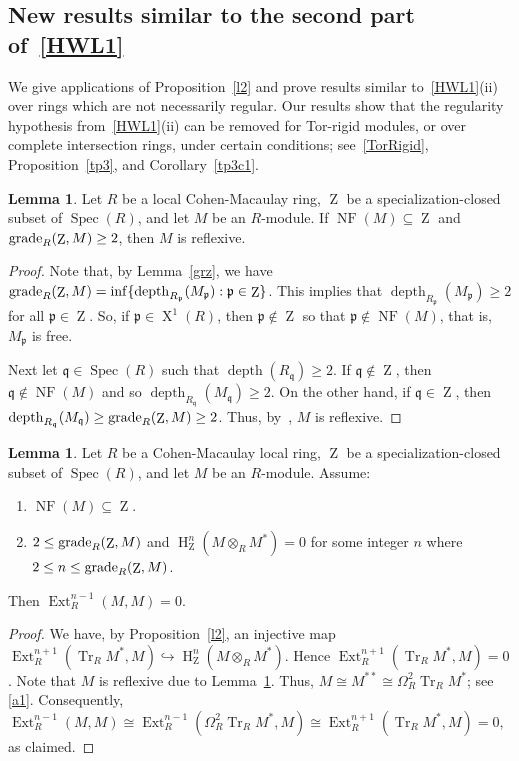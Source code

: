 \documentclass[11pt]{amsart}
\theoremstyle{definition}
\theoremstyle{definition}
\newtheorem{lem}[thm]{Lemma}
\numberwithin{equation}{section}
\newcommand{\fp}{\mathfrak{p}}
\newcommand{\fq}{\mathfrak{q}}
\DeclareMathOperator{\gr}{\textnormal{grade}}
\DeclareMathOperator{\Tr}{Tr}
\DeclareMathOperator{\X}{X}
\DeclareMathOperator{\mz}{Z}
\DeclareMathOperator{\depth}{depth}
\DeclareMathOperator{\Ext}{Ext}
\DeclareMathOperator{\hh}{H}
\DeclareMathOperator{\Spec}{Spec}
\DeclareMathOperator{\NF}{NF}
\begin{document}
\subsection*{New results similar to the second part of~\ref{HWL1}} We give applications of Proposition~\ref{l2} and prove results similar to~\ref{HWL1}(ii) over rings which are not necessarily regular. Our results show that the regularity hypothesis from~\ref{HWL1}(ii) can be removed for Tor-rigid modules, or over complete intersection rings, under certain conditions; see~\ref{TorRigid}, Proposition~\ref{tp3}, and Corollary~\ref{tp3c1}.

\begin{lem} \label{remzi} Let $R$ be a local Cohen-Macaulay ring, $\mz$ be a specialization-closed subset of $\Spec(R)$, and let $M$ be an $R$-module. If $\NF(M)\subseteq\mz$ and $\gr_R(\mz,M)\geq 2$, then $M$ is reflexive. 
\end{lem}

\begin{proof} Note that, by Lemma~\ref{grz}, we have $\gr_R(\mz,M)=\inf\{\depth_{R_\fp}(M_\fp) : \fp\in\mz\}$. This implies that $\depth_{R_\fp}(M_\fp) \geq 2$ for all $\fp \in \mz$. So, if $\fp\in\X^{1}(R)$, then $\fp \notin \mz$ so that $\fp \notin \NF(M)$, that is, $M_\fp$ is free.

Next let $\fq\in \Spec(R)$ such that $\depth(R_\fq)\geq 2$. If $\fq \notin \mz$, then $\fq \notin \NF(M)$ and so $\depth_{R_\fq}(M_\fq)\geq 2$. On the other hand, if $\fq \in \mz$, then 
$\depth_{R_\fq}(M_\fq) \geq \gr_R(\mz,M)\geq 2$. Thus, by~\cite[1.4.1(b)]{BH}, $M$ is reflexive.
\end{proof}

\begin{lem} \label{remzii} Let $R$ be a Cohen-Macaulay local ring, $\mz$ be a specialization-closed subset of $\Spec(R)$, and let $M$ be an $R$-module. Assume:
\begin{enumerate}[\rm(i)]
\item $\NF(M)\subseteq\mz$.
\item $2\leq \gr_R(\mz,M)$ and $\hh^n_{\mz}(M\otimes_RM^*)=0$ for some integer $n$ where $2\leq n\leq\gr_R(\mz,M)$.
\end{enumerate} 
Then $\Ext^{n-1}_R(M,M)=0$. 
\end{lem}

\begin{proof} We have, by Proposition~\ref{l2}, an injective map $\Ext^{n+1}_R(\Tr_R M^{\ast}, M)\hookrightarrow\hh^{n}_{\mz}(M\otimes_RM^{\ast})$. Hence  $\Ext^{n+1}_R(\Tr_R M^{\ast}, M)=0$. Note that $M$ is reflexive due to Lemma~\ref{remzi}. Thus, $M\cong M^{**}\cong \Omega_R^2\Tr_R M^*$; see \ref{a1}. Consequently, $\Ext^{n-1}_R(M,M) \cong \Ext^{n-1}_R(\Omega_R^2 \Tr_R M^{\ast},M) \cong \Ext^{n+1}_R(\Tr_R M^{\ast}, M)=0$, as claimed.
\end{proof}
\end{document}
